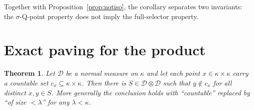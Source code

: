 \documentclass[11pt]{article}
\newtheorem{theorem}{Theorem}[section]
\theoremstyle{definition}
\newcommand{\D}{\mathcal{D}}
\begin{document}
Together with Proposition~\ref{prop:notiso}, the corollary separates two
invariants: the $\sigma$-Q-point property does not imply the full-selector
property.

\section{Exact paving for the product}\label{sec:paving}

\begin{theorem}\label{thm:paving-product}
Let $\D$ be a normal measure on $\kappa$ and let each point
$x\in\kappa\times\kappa$ carry a countable set
$c_x\subseteq\kappa\times\kappa$. Then there is $S\in\D\otimes\D$ such
that $y\notin c_x$ for all distinct $x,y\in S$. More generally the
conclusion holds with ``countable'' replaced by ``of size $<\lambda$'' for
any $\lambda<\kappa$.
\end{theorem}
\end{document}

